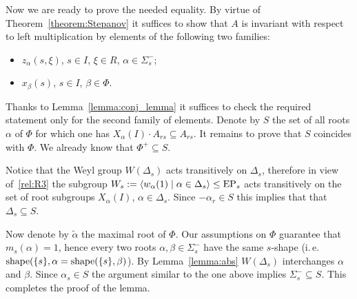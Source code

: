 Now we are ready to prove the needed equality.
By virtue of Theorem~\ref{theorem:Stepanov} it suffices to show that $A$ is invariant with respect to left multiplication by elements of the following two families:
\begin{itemize} \item $z_{\alpha}(s, \xi)$, $s\in I$, $\xi \in R$, $\alpha\in\Sigma^-_s$;
 \item $x_{\beta}(s)$, $s \in I$, $\beta \in \Phi$. \end{itemize}
Thanks to Lemma~\ref{lemma:conj_lemma} it suffices to check the required statement only for the second family of elements.
Denote by $S$ the set of all roots $\alpha$ of $\Phi$ for which one has $X_{\alpha}(I)\cdot A_{rs}\subseteq A_{rs}$.
It remains to prove that $S$ coincides with $\Phi$. We already know that $\Phi^+ \subseteq S$.

Notice that the Weyl group $W(\Delta_s)$ acts transitively on $\Delta_s$, therefore in view of~\ref{rel:R3} the subgroup
$W_s := \langle w_\alpha(1) \mid \alpha\in\Delta_s\rangle \leq \operatorname{EP}_s$ acts transitively on the set of root subgroups $X_\alpha(I)$, $\alpha\in \Delta_s$.
Since $-\alpha_r\in S$ this implies that that $\Delta_s\subseteq S$.

Now denote by $\widetilde{\alpha}$ the maximal root of $\Phi$. Our assumptions on $\Phi$ guarantee that $m_s(\alpha)=1$, 
hence every two roots $\alpha, \beta \in \Sigma^-_s$ have the same $s$-shape (i.\,e. $\operatorname{shape}(\{s\}, \alpha = \operatorname{shape}(\{s\}, \beta)$).
By Lemma~\ref{lemma:abs} $W(\Delta_s)$ interchanges $\alpha$ and $\beta$. %
Since $\alpha_s \in S$ the argument similar to the one above implies $\Sigma^-_s\subseteq S$. This completes the proof of the lemma. 